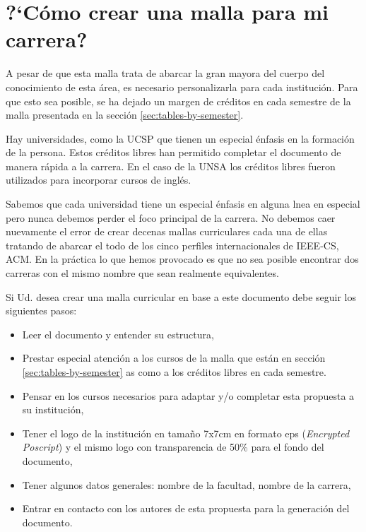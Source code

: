 \section*{?`Cómo crear una malla para mi carrera?}
%

A pesar de que esta malla trata de abarcar la gran mayor­a del cuerpo del conocimiento de esta área,  
es necesario personalizarla para cada institución. Para que esto sea posible, se ha dejado un 
margen de créditos en cada semestre de la malla presentada en la sección \ref{sec:tables-by-semester}.

Hay universidades, como la \acf{UCSP} que tienen un especial énfasis en la formación de la persona. 
Estos créditos libres han permitido completar el documento de manera rápida a la carrera. 
En el caso de la \acf{UNSA} los créditos libres fueron utilizados para incorporar cursos de inglés. 

Sabemos que cada universidad tiene un especial énfasis en alguna l­nea en especial pero nunca 
debemos perder el foco principal de la carrera. No debemos caer nuevamente el error de crear 
decenas mallas curriculares cada una de ellas tratando de abarcar el todo de los cinco perfiles 
internacionales de IEEE-CS, ACM. En la práctica lo que hemos provocado es que no sea posible 
encontrar dos carreras con el mismo nombre que sean realmente equivalentes. 

Si Ud. desea crear una malla curricular en base a este documento debe seguir los siguientes pasos:

\begin{itemize}
\item Leer el documento y entender su estructura,
\item Prestar especial atención a los cursos de la malla que están en sección \ref{sec:tables-by-semester} 
      as­ como a los créditos libres en cada semestre.
\item Pensar en los cursos necesarios para adaptar y/o completar esta propuesta a su institución,
\item Tener el logo de la institución en tamaño 7x7cm en formato eps (\textit{Encrypted Poscript}) y 
      el mismo logo con transparencia de 50\% para el fondo del documento,
\item Tener algunos datos generales: nombre de la facultad, nombre de la carrera, 
\item Entrar en contacto con los autores de esta propuesta para la generación del documento.
\end{itemize}
